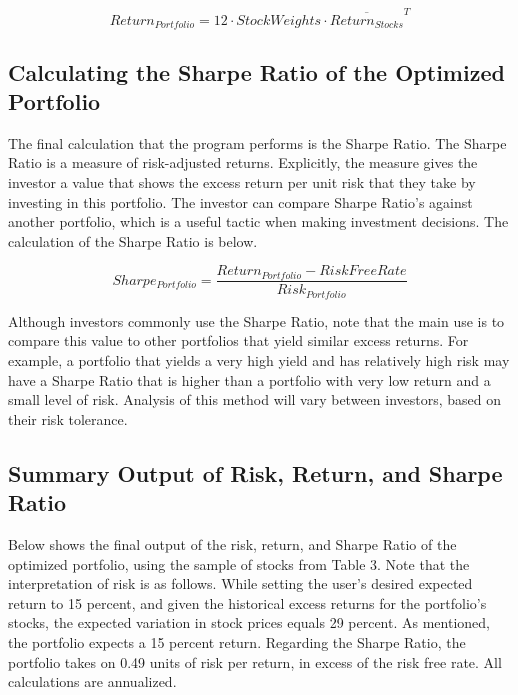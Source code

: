 \documentclass[12pt,english]{article}
\begin{document}
\begin{doublespace}
                \begin{center}
                    \begin{equation} \label{Portfolio Return}
                        Return_{Portfolio} = 
                        12 \cdot StockWeights\cdot \overline{Return_{Stocks}}^{T}
                    \end{equation}
                \end{center}
        
        \subsection{Calculating the Sharpe Ratio of the Optimized Portfolio}

            \indent{}\indent{}
            The final calculation that the program performs is the Sharpe Ratio. The Sharpe Ratio is a measure of risk-adjusted returns. Explicitly, the measure gives the investor a value that shows the excess return per unit risk that they take by investing in this portfolio. The investor can compare Sharpe Ratio’s against another portfolio, which is a useful tactic when making investment decisions. The calculation of the Sharpe Ratio is below.
            	
                \begin{center}
                    \begin{equation} \label{Sharpe Ratio}
                        Sharpe_{Portfolio} = 
                        \frac{Return_{Portfolio} - RiskFreeRate}{Risk_{Portfolio}} 
                    \end{equation}
                \end{center}
                
            \indent{}
            Although investors commonly use the Sharpe Ratio, note that the main use is to compare this value to other portfolios that yield similar excess returns. For example, a portfolio that yields a very high yield and has relatively high risk may have a Sharpe Ratio that is higher than a portfolio with very low return and a small level of risk. Analysis of this method will vary between investors, based on their risk tolerance.
            
        \subsection{Summary Output of Risk, Return, and Sharpe Ratio}
            \indent{}\indent{}
            Below shows the final output of the risk, return, and Sharpe Ratio of the optimized portfolio, using the sample of stocks from Table 3. Note that the interpretation of risk is as follows. While setting the user's desired expected return to 15 percent, and given the historical excess returns for the portfolio's stocks, the expected variation in stock prices equals 29 percent. As mentioned, the portfolio expects a 15 percent return. Regarding the Sharpe Ratio, the portfolio takes on 0.49 units of risk per return, in excess of the risk free rate. All calculations are annualized.
            

\end{doublespace}
\end{document}
